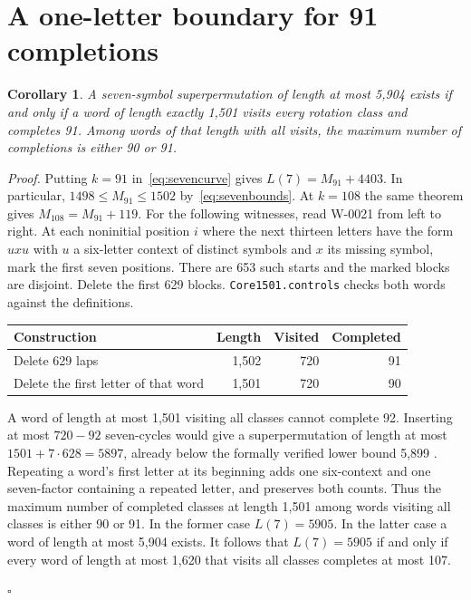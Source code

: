 \documentclass[11pt]{article}
\newtheorem{corollary}[theorem]{Corollary}
\newenvironment{proof}[1][Proof]{\par\smallskip\noindent\textit{#1.}\enspace}{\unskip\nobreak\hfill\ensuremath{\square}\par\smallskip}
\begin{document}
\section{A one-letter boundary for 91 completions}
\label{sec:decision}
\begin{corollary}\label{cor:decision}
A seven-symbol superpermutation of length at most 5,904 exists if and only if a word of length exactly 1,501 visits every rotation class and completes 91. Among words of that length with all visits, the maximum number of completions is either 90 or 91.
\end{corollary}
\begin{proof}
Putting $k=91$ in~\eqref{eq:sevencurve} gives $L(7)=M_{91}+4403$.
In particular, $1498\le M_{91}\le1502$ by~\eqref{eq:sevenbounds}.
At $k=108$ the same theorem gives $M_{108}=M_{91}+119$.
For the following witnesses, read W-0021 from left to right. At each noninitial position $i$ where the next thirteen letters have the form $uxu$ with $u$ a six-letter context of distinct symbols and $x$ its missing symbol, mark the first seven positions. There are 653 such starts and the marked blocks are disjoint. Delete the first 629 blocks.
\texttt{Core1501.controls} checks both words against the definitions.
\begin{center}
\begin{tabular}{@{}lrrr@{}}\toprule
Construction & Length & Visited & Completed \\ \midrule
Delete 629 laps & 1,502 & 720 & 91 \\
Delete the first letter of that word & 1,501 & 720 & 90 \\
\bottomrule\end{tabular}
\end{center}
A word of length at most 1,501 visiting all classes cannot complete 92. Inserting at most $720-92$ seven-cycles would give a superpermutation of
length at most $1501+7\cdot628=5897$, already below the formally
verified lower bound 5,899 \cite{halfar}. Repeating a word's first
letter at its beginning adds one six-context and one seven-factor
containing a repeated letter, and preserves both counts. Thus the maximum
number of completed classes at length 1,501 among words visiting all classes
is either 90 or 91. In the former case $L(7)=5905$. In the latter case a
word of length at most 5,904 exists. It follows that $L(7)=5905$ if and only if every word of length at most 1,620 that visits all classes completes at most 107.

\end{proof}
\end{document}
